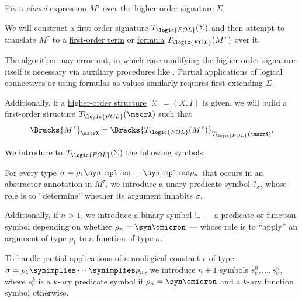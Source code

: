 \begin{algorithm}\label{alg:hol_to_fol}
  Fix a \hyperref[def:hol_closed_expression]{\emph{closed} expression} \( M^\tau \) over the \hyperref[def:hol_signature]{higher-order signature} \( \Sigma \).

  We will construct a \hyperref[def:fol_signature]{first-order signature} \( T_{\logic{FOL}}(\Sigma) \) and then attempt to translate \( M^\tau \) to a \hyperref[def:fol_term]{first-order term} or \hyperref[def:fol_formula]{formula} \( T_{\logic{FOL}}(M^\tau) \) over it.

  The algorithm may error out, in which case modifying the higher-order signature itself is necessary via auxiliary procedures like . Partial applications of logical connectives or using formulas as values similarly requires first extending \( \Sigma \).

  Additionally, if a \hyperref[def:hol_structure]{higher-order structure} \( \mscrX = (X, I) \) is given, we will build a first-order structure \( T_{\logic{FOL}}(\mscrX) \) such that
  \begin{equation*}
    \Bracks{ M^\tau }_\mscrX = \Bracks{ T_{\logic{FOL}}(M^\tau) }_{T_{\logic{FOL}}(\mscrX)}.
  \end{equation*}

  \begin{thmenum}
     We introduce to \( T_{\logic{FOL}}(\Sigma) \) the following symbols:
    \begin{thmenum}
       For every type \( \sigma = \rho_1 \synimplies \cdots \synimplies \rho_n \) that occurs in an abstractor annotation in \( M^\tau \), we introduce a unary predicate symbol \( ?_\sigma \), whose role is to \enquote{determine} whether its argument inhabits \( \sigma \).

      Additionally, if \( n > 1 \), we introduce a binary symbol \( !_\sigma \) --- a predicate or function symbol depending on whether \( \rho_n = \syn\omicron \) --- whose role is to \enquote{apply} an argument of type \( \rho_1 \) to a function of type \( \sigma \).

       To handle partial applications of a nonlogical constant \( c \) of type \( \sigma = \rho_1 \synimplies \cdots \synimplies \rho_n \), we introduce \( n + 1 \) symbols \( s_c^0, \ldots, s_c^n \), where \( s_c^k \) is a \( k \)-ary predicate symbol if \( \rho_n = \syn\omicron \) and a \( k \)-ary function symbol otherwise.
    \end{thmenum}


\end{thmenum}
\end{algorithm}
